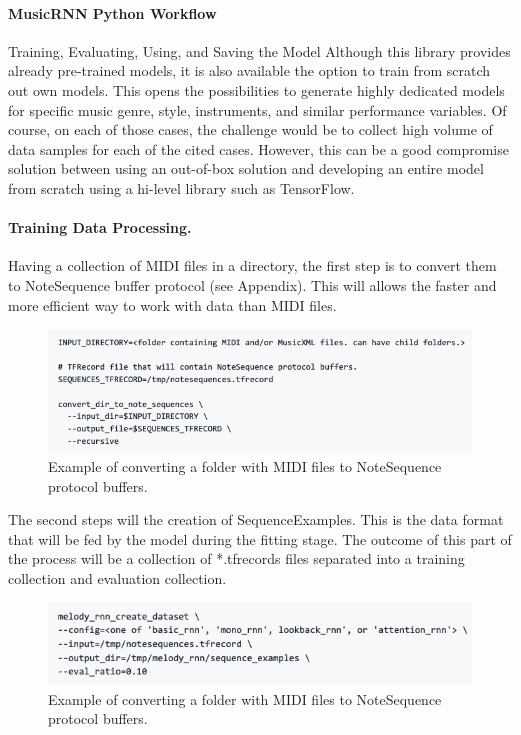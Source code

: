 \paragraph{MusicRNN Python Workflow} Training, Evaluating, Using, and Saving the Model
Although this library provides already pre-trained models, it is also available the option
to train from scratch out own models. This opens the possibilities to generate highly
dedicated models for specific music genre, style, instruments, and similar performance
variables. Of course, on each of those cases, the challenge would be to collect high
volume of data samples for each of the cited cases. However, this can be a good compromise
solution between using an out-of-box solution and developing an entire model from scratch
using a hi-level library such as TensorFlow.

\paragraph{Training Data Processing.} Having a collection of MIDI files in a directory, the
first step is to convert them to NoteSequence buffer protocol (see Appendix). This will
allows the faster and more efficient way to work with data than MIDI files.

\begin{figure}[h!]
  \centering
  \includegraphics[width=\linewidth]{image/fig_JDF03.png}
  \caption{Example of converting a folder with MIDI files to NoteSequence protocol buffers.}
\end{figure}


The second steps will the creation of SequenceExamples. This is the data format that will
be fed by the model during the fitting stage. The outcome of this part of the process will
be a collection of *.tfrecords files separated into a training collection and evaluation
collection.

\begin{figure}[h!]
  \centering
  \includegraphics[width=\linewidth]{image/fig_JDF04.png}
  \caption{Example of converting a folder with MIDI files to NoteSequence protocol buffers.}
\end{figure}



